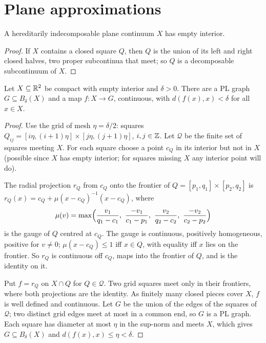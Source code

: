\section{Plane approximations}

\begin{lemma}\label{lem:hi-interior}
A hereditarily indecomposable plane continuum $X$ has empty interior.
\end{lemma}

\begin{proof}
If $X$ contains a closed square $Q$, then $Q$ is the union of its left and right closed halves, two proper subcontinua that meet; so $Q$ is a
decomposable subcontinuum of $X$.
\end{proof}


\begin{lemma}\label{lem:grid}
Let $X\subseteq\mathbb{R}^2$ be compact with empty interior and $\delta>0$. There are a PL graph $G\subseteq B_\delta(X)$ and a map $f\colon X\to G$, continuous,
with $d(f(x),x)<\delta$ for all $x\in X$.
\end{lemma}

\begin{proof}
Use the grid of mesh $\eta=\delta/2$: squares $Q_{ij}=[i\eta,(i+1)\eta]\times[j\eta,(j+1)\eta]$, $i,j\in\mathbb{Z}$. Let $\mathcal Q$ be the finite set of squares
meeting $X$. For each square choose a point $c_Q$ in its interior but not in $X$ (possible since $X$ has empty interior; for squares missing $X$ any
interior point will do).

The radial projection $r_Q$ from $c_Q$ onto the frontier of $Q=[p_1,q_1]\times[p_2,q_2]$ is $r_Q(x)=c_Q+\mu(x-c_Q)^{-1}(x-c_Q)$, where
\[
\mu(v)=\max\Bigl(\frac{v_1}{q_1-c_1},\ \frac{-v_1}{c_1-p_1},\ \frac{v_2}{q_2-c_2},\ \frac{-v_2}{c_2-p_2}\Bigr)
\]
is the gauge of $Q$ centred at $c_Q$. The gauge is continuous, positively homogeneous, positive for $v\neq0$; $\mu(x-c_Q)\le1$ iff $x\in Q$, with
equality iff $x$ lies on the frontier. So $r_Q$ is continuous off $c_Q$, maps into the frontier of $Q$, and is the identity on it.

Put $f=r_Q$ on $X\cap Q$ for $Q\in\mathcal Q$. Two grid squares meet only in their frontiers, where both projections are the identity. As finitely many
closed pieces cover $X$, $f$ is well defined and continuous. Let $G$ be the union of the edges of the squares of $\mathcal Q$; two distinct grid edges
meet at most in a common end, so $G$ is a PL graph. Each square has diameter at most $\eta$ in the sup-norm and meets $X$, which gives $G\subseteq
B_\delta(X)$ and $d(f(x),x)\le\eta<\delta$.
\end{proof}

